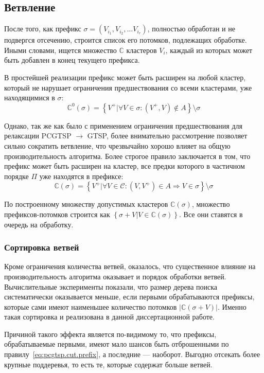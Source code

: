 
\subsection{Ветвление}
\label{sec:pgstcp.branch}

После того, как префикс
$\sigma=(V_{i_1}, V_{i_2}, \dots V_{i_r})$,
полностью обработан и не подвергся отсечению,
строится список его потомков,
подлежащих обработке.
Иными словами, ищется множество $\mathbb C$
кластеров $V_i$,
каждый из которых может быть добавлен в конец
текущего префикса.

В простейшей реализации префикс может быть
расширен на любой кластер,
который не нарушает ограничения предшествования
со всеми кластерами, уже находящимися в $\sigma$:
$$
\mathbb C^0(\sigma) =
  \left\{
    V^+|
      \forall V \in \sigma: (V^+, V) \notin A
  \right\}
  \setminus \sigma
$$

Однако, так же как было с применением ограничения предшествования
для релаксации PCGTSP $\to$ GTSP,
более внимательно рассмотрение позволяет
сильно сократить ветвление,
что чрезвычайно хорошо влияет
на общую производительность алгоритма.
Более строгое правило заключается в том,
что префикс может быть расширен на кластер,
все предки которого в частичном порядке $\Pi$
уже находятся в префиксе:
$$
\mathbb C(\sigma)=
  \left\{
    V^+|
    \forall V \in \mathcal C: (V, V^+)\in A \Rightarrow V \in \sigma
  \right\}
  \setminus \sigma
$$

По построенному множеству допустимых кластеров $\mathbb C(\sigma)$,
множество префиксов-потомков строится как
$\left\{\sigma + V| V \in \mathbb C(\sigma)\right\}$.
Все они ставятся в очередь на обработку.

\subsubsection{Сортировка ветвей}

Кроме ограничения количества ветвей,
оказалось,
что существенное влияние на производительность
алгоритма оказывает и порядок обработки ветвей.
Вычислительные эксперименты показали,
что размер дерева поиска систематически
оказывается меньше,
если первыми обрабатываются префиксы,
которые сами имеют наименьшее количество потомков
$|\mathbb C(\sigma+V)|$.
Именно такая сортировка и реализована
в данной диссертационной работе.

Причиной такого эффекта является по-видимому то,
что префиксы, обрабатываемые первыми,
имеют мало шансов быть отброшенными
по правилу~\eqref{eq:pcgtsp.cut.prefix},
а последние --- наоборот.
Выгодно отсекать более крупные поддеревья,
то есть те, которые содержат больше ветвей.

